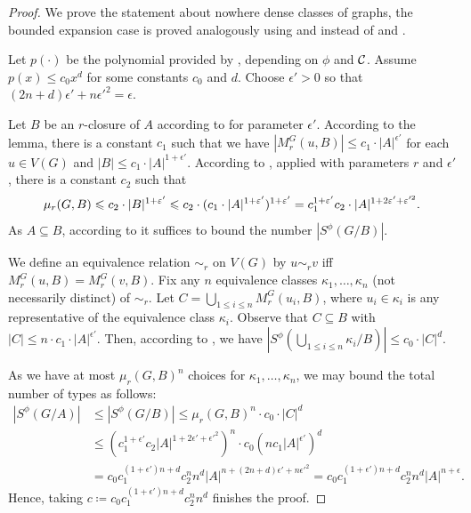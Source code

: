 \begin{proof}
We prove the statement about nowhere dense classes of graphs,
the bounded expansion case is proved analogously using  and  instead of  and .

Let $p(\cdot)$ be the polynomial provided by ,
depending on $\phi$ and $\mathcal{C}$. Assume $p(x)\leq c_0x^d$ 
for some constants $c_0$ and $d$. 
Choose $\epsilon'>0$ so that $(2n+d)\epsilon'+n\epsilon'^2=\epsilon$. 

Let $B$ be an $r$-closure of $A$ according to  for parameter $\epsilon'$. 
According to the lemma, 
there is a constant $c_1$ such that 
we have $|M_r^G(u,B)|\leq c_1\cdot |A|^{\epsilon'}$ 
for each $u\in V(G)$ and 
$|B|\leq c_1\cdot |A|^{1+\epsilon'}$. According to 
, applied
with parameters $r$ and $\epsilon'$, 
there is a constant
$c_2$ such that 
$$\mu_r(G,B)\leqslant c_2\cdot |B|^{1+\varepsilon'}\leqslant
c_2\cdot (c_1\cdot |A|^{1+\varepsilon'})^{1+\varepsilon'}=c_1^{1+\varepsilon'}c_2\cdot|A|^{1+2\varepsilon'+\varepsilon'^2}.$$
As $A\subseteq B$, 
according to  it suffices to bound the
number $|S^\phi(G/B)|$. 

We define an equivalence relation $\sim_r$ on 
$V(G)$ by $u\sim_r v$ iff 
$M_r^G(u,B)=M_r^G(v,B)$. 
Fix any $n$ equivalence
classes $\kappa_1,\ldots, \kappa_n$ (not necessarily
distinct) of $\sim_r$. Let $C=\bigcup_{1\leq i\leq n}M_r^G(u_i, B)$, 
where $u_i\in \kappa_i$ is any representative of the
equivalence class $\kappa_i$. Observe that $C\subseteq B$ with
$|C|\leq n\cdot c_1\cdot |A|^{\epsilon'}$. 
Then, according to , 
we have $|S^\phi(\bigcup_{1\leq i\leq n}\kappa_i/B)|\leq
c_0\cdot |C|^d$. 

As we have at most $\mu_r(G,B)^n$ choices for 
$\kappa_1,\ldots, \kappa_n$, we may bound the total 
number of types as follows:
\begin{align*}
|S^\phi(G/A)| & \leq |S^\phi(G/B)|\leq \mu_r(G,B)^n \cdot c_0\cdot |C|^d\\
& \leq \left(c_1^{1+\epsilon'}c_2|A|^{1+2\epsilon'+\epsilon'^2}\right)^n\cdot c_0\left(nc_1|A|^{\epsilon'}\right)^d\\
& = c_0c_1^{(1+\epsilon')n+d}c_2^nn^d|A|^{n+(2n+d)\epsilon'+n\epsilon'^2} = c_0c_1^{(1+\epsilon')n+d}c_2^nn^d|A|^{n+\epsilon}.
\end{align*}
Hence, taking $c\coloneqq c_0c_1^{(1+\epsilon')n+d}c_2^nn^d$ finishes the proof.
\end{proof}

